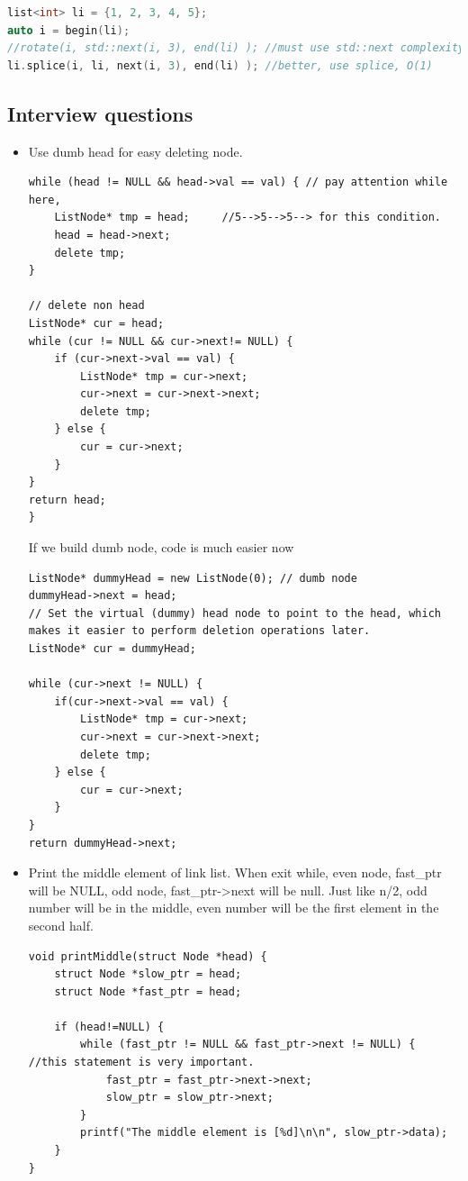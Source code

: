 \documentclass[a4paper,11pt,twoside]{book}
\begin{document}
\begin{lstlisting}[frame=single, language=c++]
list<int> li = {1, 2, 3, 4, 5};
auto i = begin(li);
//rotate(i, std::next(i, 3), end(li) ); //must use std::next complexity is O(n).
li.splice(i, li, next(i, 3), end(li) ); //better, use splice, O(1)
\end{lstlisting}



\subsection{Interview questions}
\begin{itemize}
	\item Use dumb head for easy deleting node. 
\begin{lstlisting}
while (head != NULL && head->val == val) { // pay attention while here, 
	ListNode* tmp = head;     //5-->5-->5--> for this condition.
	head = head->next;
	delete tmp;
}

// delete non head 
ListNode* cur = head;
while (cur != NULL && cur->next!= NULL) {
	if (cur->next->val == val) {
		ListNode* tmp = cur->next;
		cur->next = cur->next->next;
		delete tmp;
	} else {
		cur = cur->next;
	}
}
return head;
}
\end{lstlisting}

	If we build dumb node, code is much easier now
\begin{lstlisting}
ListNode* dummyHead = new ListNode(0); // dumb node
dummyHead->next = head; 
// Set the virtual (dummy) head node to point to the head, which makes it easier to perform deletion operations later.
ListNode* cur = dummyHead;

while (cur->next != NULL) {
	if(cur->next->val == val) {
		ListNode* tmp = cur->next;
		cur->next = cur->next->next;
		delete tmp;
	} else {
		cur = cur->next;
	}
}
return dummyHead->next;
\end{lstlisting}
	
	\item Print the middle element of link list. When exit while, even node, fast\_ptr will be NULL, odd node, fast\_ptr->next will be null. Just like n/2, odd number will be in the middle, even number will be the first element in the second half.
\begin{lstlisting}[breaklines]
void printMiddle(struct Node *head) { 
	struct Node *slow_ptr = head; 
	struct Node *fast_ptr = head; 

	if (head!=NULL) {		 
		while (fast_ptr != NULL && fast_ptr->next != NULL) {  //this statement is very important.
			fast_ptr = fast_ptr->next->next; 
			slow_ptr = slow_ptr->next; 
		} 
		printf("The middle element is [%d]\n\n", slow_ptr->data); 
	} 
} 
\end{lstlisting}
	

\end{itemize}
\end{document}
